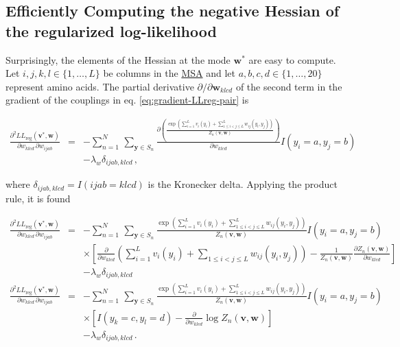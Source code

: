 \documentclass[11pt,a4paper,twoside]{book}
\newcommand{\eq}{\!=\!}
\newcommand{\LLreg}{L\!L_\mathrm{reg}}
\newcommand{\Sn}{S_n}
\renewcommand{\v}{\mathbf{v}}
\newcommand{\w}{\mathbf{w}}
\newcommand{\wijab}{w_{ijab}}
\newcommand{\wklcd}{w_{klcd}}
\theoremstyle{definition}
\theoremstyle{definition}
\theoremstyle{remark}
\begin{document}
\subsection{Efficiently Computing the negative Hessian of the
regularized log-likelihood}\label{neg-Hessian-computation}

Surprisingly, the elements of the Hessian at the mode \(\w^*\) are easy
to compute. Let \(i,j,k,l \in \{1,\ldots,L\}\) be columns in the
\protect\hyperlink{abbrev}{MSA} and let
\(a, b, c, d \in \{1,\ldots,20\}\) represent amino acids. The partial
derivative \(\partial / \partial \w_{klcd}\) of the second term in the
gradient of the couplings in eq. \eqref{eq:gradient-LLreg-pair} is

\begin{eqnarray}
    \frac{\partial^2 \LLreg(\v^*,\w)}{\partial \wklcd \, \partial \wijab } 
    &=&  - \sum_{n=1}^{N} \, \sum_{\mathbf{y} \in \Sn} \frac{\partial \left( \frac{\exp \left( \sum_{i=1}^L v_i(y_i) + \sum_{1 \le i < j \le L}^L w_{ij}(y_i,y_j) \right) }{Z_n(\v,\w)} \right)}{\partial \wklcd}   I(y_i \eq a, y_j \eq b) \nonumber \\
    &&- \lambda_w \delta_{ijab,klcd} \,,
\end{eqnarray}

where \(\delta_{ijab,klcd} = I(ijab=klcd)\) is the Kronecker delta.
Applying the product rule, it is found

\begin{eqnarray}
    \frac{\partial^2 \LLreg(\v^*,\w)}{\partial \wklcd \, \partial \wijab  } 
    &=&  - \sum_{n=1}^{N} \, \sum_{\mathbf{y} \in \Sn} \frac{\exp \left(\sum_{i=1}^L v_i(y_i) + \sum_{1 \le i < j \le L}^L w_{ij}(y_i,y_j)  \right)}{Z_n(\v,\w)}  I(y_i \eq a, y_j \eq b) \nonumber \\
    && \times  \left[ \frac{\partial}{\partial \wklcd} \left( \sum_{i=1}^L v_i(y_i) + \sum_{1 \le i < j \le L}  w_{ij}(y_i,y_j)  \right) 
                  - \frac{1}{Z_n(\v,\w)} \frac{\partial  Z_n(\v,\w) }{\partial\wklcd} \right] \nonumber\\
    &&- \lambda_w \delta_{ijab,klcd} \\
    \frac{\partial^2 \LLreg(\v^*,\w)}{\partial \wklcd \, \partial \wijab  } 
    &=&  - \sum_{n=1}^{N} \, \sum_{\mathbf{y} \in \Sn} \frac{\exp \left(\sum_{i=1}^L v_i(y_i) + \sum_{1 \le i < j \le L}^L w_{ij}(y_i,y_j)  \right)}{Z_n(\v,\w)}  I(y_i \eq a, y_j \eq b) \nonumber\\
    && \times \left[ I(y_k \eq c, y_l \eq d) - \frac{\partial}{\partial \wklcd} \log Z_n(\v,\w) \right] \nonumber\\
    &&- \lambda_w \delta_{ijab,klcd} \,.
\end{eqnarray}
\end{document}
